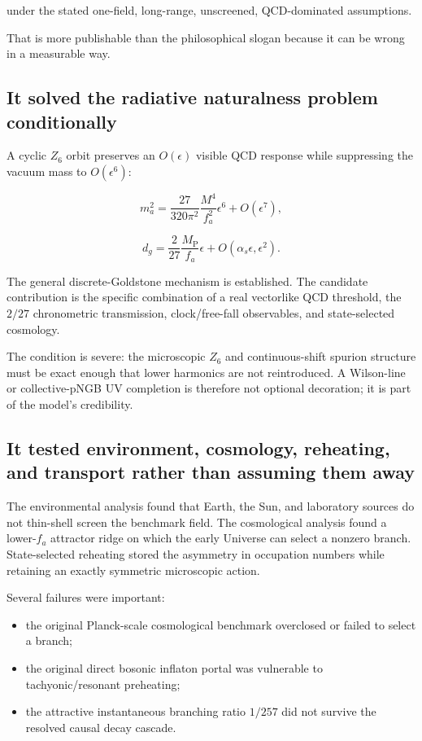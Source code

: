 \documentclass[
  10pt,
]{article}
\providecommand{\tightlist}{%
  \setlength{\itemsep}{0pt}\setlength{\parskip}{0pt}}
\begin{document}
under the stated one-field, long-range, unscreened, QCD-dominated
assumptions.

That is more publishable than the philosophical slogan because it can be
wrong in a measurable way.

\subsection{It solved the radiative naturalness problem
conditionally}\label{it-solved-the-radiative-naturalness-problem-conditionally}

A cyclic \(Z_6\) orbit preserves an \(O(\epsilon)\) visible QCD response
while suppressing the vacuum mass to \(O(\epsilon^6)\):

\[
\boxed{
m_a^2
=
\frac{27}{320\pi^2}
\frac{M^4}{f_a^2}\epsilon^6+
O(\epsilon^7),
}
\]

\[
\boxed{
d_g
=
\frac{2}{27}
\frac{M_{\mathrm P}}{f_a}\epsilon
+
O(\alpha_s\epsilon,\epsilon^2).
}
\]

The general discrete-Goldstone mechanism is established. The candidate
contribution is the specific combination of a real vectorlike QCD
threshold, the \(2/27\) chronometric transmission, clock/free-fall
observables, and state-selected cosmology.

The condition is severe: the microscopic \(Z_6\) and continuous-shift
spurion structure must be exact enough that lower harmonics are not
reintroduced. A Wilson-line or collective-pNGB UV completion is
therefore not optional decoration; it is part of the model's
credibility.

\subsection{It tested environment, cosmology, reheating, and transport
rather than assuming them
away}\label{it-tested-environment-cosmology-reheating-and-transport-rather-than-assuming-them-away}

The environmental analysis found that Earth, the Sun, and laboratory
sources do not thin-shell screen the benchmark field. The cosmological
analysis found a lower-\(f_a\) attractor ridge on which the early
Universe can select a nonzero branch. State-selected reheating stored
the asymmetry in occupation numbers while retaining an exactly symmetric
microscopic action.

Several failures were important:

\begin{itemize}
\tightlist
\item
  the original Planck-scale cosmological benchmark overclosed or failed
  to select a branch;
\item
  the original direct bosonic inflaton portal was vulnerable to
  tachyonic/resonant preheating;
\item
  the attractive instantaneous branching ratio \(1/257\) did not survive
  the resolved causal decay cascade.
\end{itemize}
\end{document}
